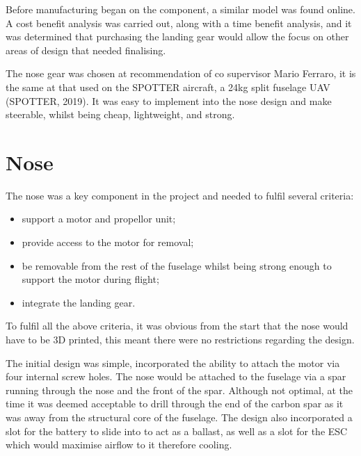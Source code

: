 \documentclass[../../main.tex]{subfiles}
\begin{document}
Before manufacturing began on the component, a similar model was found online. A cost benefit analysis was carried out, along with a time benefit analysis, and it was determined that purchasing the landing gear would allow the focus on other areas of design that needed finalising. 


The nose gear was chosen at recommendation of co supervisor Mario Ferraro, it is the same at that used on the SPOTTER aircraft, a 24kg split fuselage UAV (SPOTTER, 2019). It was easy to implement into the nose design and make steerable, whilst being cheap, lightweight, and strong. 

\section{Nose} \label{sec:final-design-proposal:nose}

The nose was a key component in the project and needed to fulfil several criteria:

\begin{itemize}
    \item support a motor and propellor unit;
    \item provide access to the motor for removal;
    \item be removable from the rest of the fuselage whilst being strong enough to support the motor during flight;
    \item integrate the landing gear.
\end{itemize}

To fulfil all the above criteria, it was obvious from the start that the nose would have to be 3D printed, this meant there were no restrictions regarding the design.  

The initial design was simple, incorporated the ability to attach the motor via four internal screw holes.
The nose would be attached to the fuselage via a spar running through the nose and the front of the spar.
Although not optimal, at the time it was deemed acceptable to drill through the end of the carbon spar as it was away from the structural core of the fuselage.
The design also incorporated a slot for the battery to slide into to act as a ballast, as well as a slot for the ESC which would maximise airflow to it therefore cooling.
\end{document}
